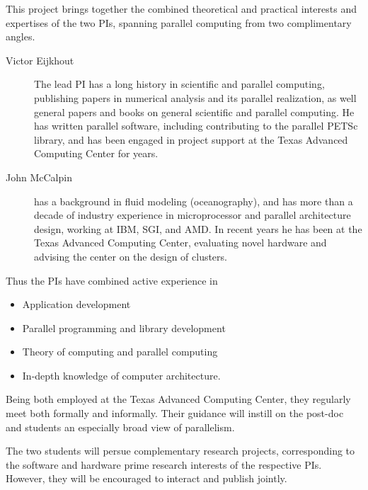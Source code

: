 This project brings together the combined theoretical and practical
interests and expertises of the two PIs, spanning parallel computing
from two complimentary angles.
\begin{description}
\item[Victor Eijkhout] The lead PI has a long history in scientific
  and parallel computing, publishing papers in numerical analysis and
  its parallel realization, as well general papers and books on
  general scientific and parallel computing. He has written parallel software,
  including contributing to the parallel PETSc library, and has been
  engaged in project support at the Texas Advanced Computing Center
  for years.
\item[John McCalpin] has a background in fluid modeling
  (oceanography), and has more than a decade of industry experience in
  microprocessor and parallel architecture design, working at IBM,
  SGI, and AMD. In recent years he has been at the Texas Advanced
  Computing Center, evaluating novel hardware and advising the center
  on the design of clusters.
\end{description}

\begin{comment}
<<<<<<< local
\end{comment}
Thus the PIs have combined active experience in
\begin{itemize}
\item Application development
\item Parallel programming and library development
\item Theory of computing and parallel computing
\item In-depth knowledge of computer architecture.
\end{itemize}
Being both employed at the Texas Advanced Computing Center,
they regularly meet both formally and informally.
Their guidance will instill
on the post-doc and students an especially broad view of parallelism.

The two students will persue complementary research projects,
corresponding to the software and hardware prime research interests of the 
respective PIs. However, they
will be encouraged to interact and publish jointly.
\begin{comment}
=======
The students will pursue complementary research projects,
corresponding to the research interests of the PIs. However, they
will be encouraged to interact and jointly publish.

>>>>>>> other
\end{comment}

